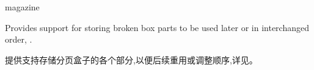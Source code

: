 \begin{docTcbKey}[library]{magazine}{}{}

Provides support for storing broken box parts to be used later or
in interchanged order, .

提供支持存储分页盒子的各个部分,以便后续重用或调整顺序,详见。

\end{docTcbKey}















